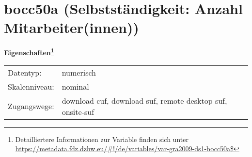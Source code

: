 
    \setcounter{footnote}{0}

    \vspace*{-1.8cm}
	\section{bocc50a (Selbstständigkeit: Anzahl Mitarbeiter(innen))}
	\label{section:bocc50a}



    \vspace*{0.5cm}
    \noindent\textbf{Eigenschaften\footnote{Detailliertere Informationen zur Variable finden sich unter
		\url{https://metadata.fdz.dzhw.eu/\#!/de/variables/var-gra2009-ds1-bocc50a$}}}\\
	\begin{tabularx}{\hsize}{@{}lX}
	Datentyp: & numerisch \\
	Skalenniveau: & nominal \\
	Zugangswege: &
	  download-cuf, 
	  download-suf, 
	  remote-desktop-suf, 
	  onsite-suf
 \\
    \end{tabularx}



